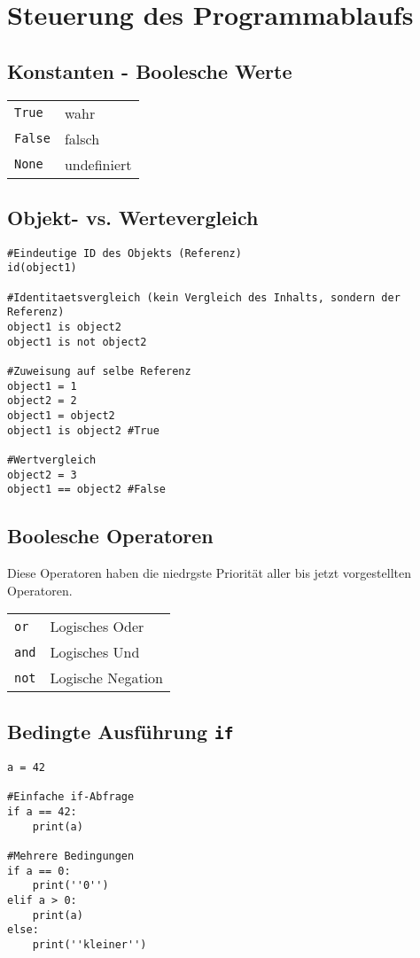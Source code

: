 \chapter{Steuerung des Programmablaufs}
\section{Konstanten - Boolesche Werte}
\begin{tabular}{ll}
\texttt{True}	&wahr\\
\texttt{False}	&falsch\\
\texttt{None}	&undefiniert\\
\end{tabular}
\section{Objekt- vs. Wertevergleich}
\begin{lstlisting}
#Eindeutige ID des Objekts (Referenz)
id(object1)

#Identitaetsvergleich (kein Vergleich des Inhalts, sondern der Referenz)
object1 is object2
object1 is not object2

#Zuweisung auf selbe Referenz
object1 = 1
object2 = 2
object1 = object2
object1 is object2 #True

#Wertvergleich
object2 = 3
object1 == object2 #False

\end{lstlisting}

\section{Boolesche Operatoren}
Diese Operatoren haben die niedrgste Priorität aller bis jetzt vorgestellten Operatoren.\\[0.5em]
\begin{tabular}{ll}
\texttt{or}		&Logisches Oder\\
\texttt{and}	&Logisches Und\\
\texttt{not}	&Logische Negation\\
\end{tabular}
\section{Bedingte Ausführung \texttt{if}}
\begin{lstlisting}
a = 42

#Einfache if-Abfrage
if a == 42:
	print(a)
	
#Mehrere Bedingungen
if a == 0:
	print(''0'')
elif a > 0:
	print(a)
else:
	print(''kleiner'')
\end{lstlisting}
